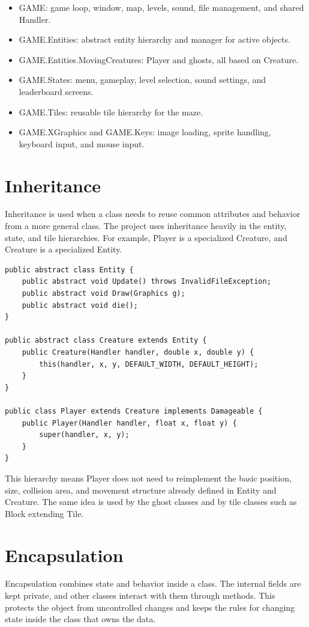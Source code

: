 \documentclass[12pt,a4paper]{article}
\begin{document}
\begin{itemize}
\item GAME: game loop, window, map, levels, sound, file management, and shared Handler.
\item GAME.Entities: abstract entity hierarchy and manager for active objects.
\item GAME.Entities.MovingCreatures: Player and ghosts, all based on Creature.
\item GAME.States: menu, gameplay, level selection, sound settings, and leaderboard screens.
\item GAME.Tiles: reusable tile hierarchy for the maze.
\item GAME.XGraphics and GAME.Keys: image loading, sprite handling, keyboard input, and mouse input.
\end{itemize}

\section*{Inheritance}
Inheritance is used when a class needs to reuse common attributes and behavior from a more general class. The project uses inheritance heavily in the entity, state, and tile hierarchies. For example, Player is a specialized Creature, and Creature is a specialized Entity.

\begin{lstlisting}
public abstract class Entity {
    public abstract void Update() throws InvalidFileException;
    public abstract void Draw(Graphics g);
    public abstract void die();
}

public abstract class Creature extends Entity {
    public Creature(Handler handler, double x, double y) {
        this(handler, x, y, DEFAULT_WIDTH, DEFAULT_HEIGHT);
    }
}

public class Player extends Creature implements Damageable {
    public Player(Handler handler, float x, float y) {
        super(handler, x, y);
    }
}
\end{lstlisting}

This hierarchy means Player does not need to reimplement the basic position, size, collision area, and movement structure already defined in Entity and Creature. The same idea is used by the ghost classes and by tile classes such as Block extending Tile.


\section*{Encapsulation}
Encapsulation combines state and behavior inside a class. The internal fields are kept private, and other classes interact with them through methods. This protects the object from uncontrolled changes and keeps the rules for changing state inside the class that owns the data.
\end{document}
